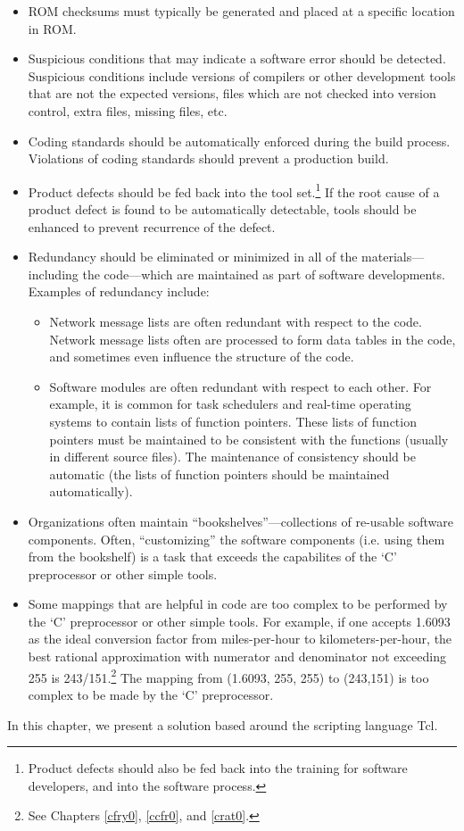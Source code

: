 \begin{itemize}
\item ROM checksums must typically be generated and placed at a specific
      location in ROM.
\item Suspicious conditions that may indicate a software error 
      should be detected.  Suspicious conditions include
	  versions of compilers or other development tools that are
	  not the expected versions, files which are not checked into
	  version control, extra files, missing files, etc.
\item Coding standards should be automatically enforced during the
      build process.  Violations of coding standards should prevent
	  a production build.
\item Product defects should be fed back into the tool set.\footnote{Product
      defects should also be fed back into the training for software
	  developers, and into the software process.}  If the root cause
	  of a product defect is found to be automatically detectable,
	  tools should be enhanced to prevent recurrence of the defect.
\item Redundancy should be eliminated or minimized in all of the
      materials---including the code---which are maintained as
	  part of software developments.  Examples of redundancy include:
	  \begin{itemize}
	  \item Network message lists are often redundant with respect to
	        the code.  Network message lists often are processed to
			form data tables in the code, and sometimes even influence
			the structure of the code.
      \item Software modules are often redundant with respect to
	        each other.  For example, it is common for task schedulers
			and real-time operating systems to contain lists of 
			function pointers.  These lists of function pointers
            must be maintained to be consistent with the functions
			(usually in different source files).  The maintenance
			of consistency should be automatic (the lists of function
			pointers should be maintained automatically).
	  \end{itemize}
\item Organizations often maintain ``bookshelves''---collections of
      re-usable software components.  Often, ``customizing'' the
	  software components (i.e. using them from the bookshelf)
	  is a task that exceeds the capabilites of the `C' preprocessor
	  or other simple tools.
\item Some mappings that are helpful in code are too complex to
      be performed by the `C' preprocessor or other simple
	  tools.  For example, if one accepts 1.6093 as the 
	  ideal conversion factor from miles-per-hour to 
	  kilometers-per-hour, the best rational approximation with
	  numerator and denominator not exceeding 255 is 243/151.\footnote{See
	  Chapters \ref{cfry0}, 
	  \ref{ccfr0}, 
	  and \ref{crat0}.}  The mapping from 
	  (1.6093, 255, 255) to (243,151) is too complex to be made
	  by the `C' preprocessor.
\end{itemize}

In this chapter, we present a solution based around the scripting language
Tcl.


